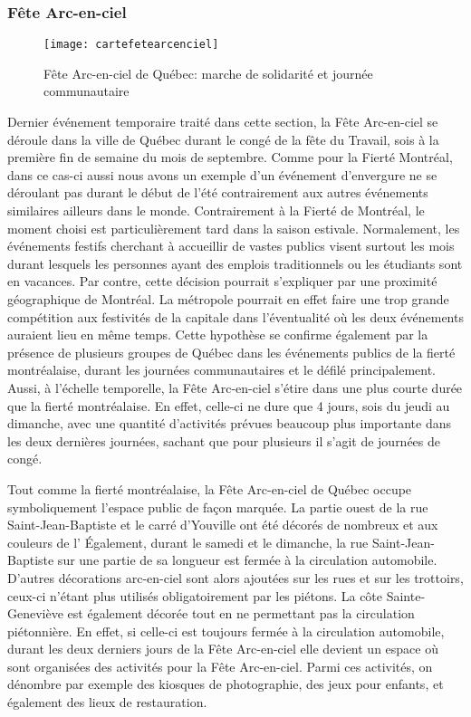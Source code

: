\subsubsection{Fête Arc-en-ciel}
\label{subsec:fetearcenciel}

\begin{figure}[h!]
  \centering
  \texttt{[image: cartefetearcenciel]}
  \caption[Fête Arc-en-ciel de Québec]{Fête Arc-en-ciel de Québec: marche de solidarité et journée communautaire}
  \label{fig:cartefetearcenciel}
\end{figure}

Dernier événement temporaire traité dans cette section, la Fête Arc-en-ciel se déroule dans la ville de Québec durant le congé de la fête du Travail, sois à la première fin de semaine du mois de septembre.
Comme pour la Fierté Montréal, dans ce cas-ci aussi nous avons un exemple d'un événement d'envergure ne se déroulant pas durant le début de l'été contrairement aux autres événements similaires ailleurs dans le monde.
Contrairement à la Fierté de Montréal, le moment choisi est particulièrement tard dans la saison estivale.
Normalement, les événements festifs cherchant à accueillir de vastes publics visent surtout les mois durant lesquels les personnes ayant des emplois traditionnels ou les étudiants sont en vacances.
Par contre, cette décision pourrait s'expliquer par une proximité géographique de Montréal.
La métropole pourrait en effet faire une trop grande compétition aux festivités de la capitale dans l'éventualité où les deux événements auraient lieu en même temps.
Cette hypothèse se confirme également par la présence de plusieurs groupes de Québec dans les événements publics de la fierté montréalaise, durant les journées communautaires et le défilé principalement.
Aussi, à l'échelle temporelle, la Fête Arc-en-ciel s'étire dans une plus courte durée que la fierté montréalaise.
En effet, celle-ci ne dure que 4 jours, sois du jeudi au dimanche, avec une quantité d'activités prévues beaucoup plus importante dans les deux dernières journées, sachant que pour plusieurs il s'agit de journées de congé.

Tout comme la fierté montréalaise, la Fête Arc-en-ciel de Québec occupe symboliquement l'espace public de façon marquée.
La partie ouest de la rue Saint-Jean-Baptiste et le carré d'Youville ont été décorés de nombreux   et  aux couleurs de l'
Également, durant le samedi et le dimanche, la rue Saint-Jean-Baptiste sur une partie de sa longueur est fermée à la circulation automobile.
D'autres décorations arc-en-ciel sont alors ajoutées sur les rues et sur les trottoirs, ceux-ci n'étant plus utilisés obligatoirement par les piétons.
La côte Sainte-Geneviève est également décorée tout en ne permettant pas la circulation piétonnière.
En effet, si celle-ci est toujours fermée à la circulation automobile, durant les deux derniers jours de la Fête Arc-en-ciel elle devient un espace où sont organisées des activités pour la Fête Arc-en-ciel. Parmi ces activités, on dénombre par exemple des kiosques de photographie, des jeux pour enfants, et également des lieux de restauration.

